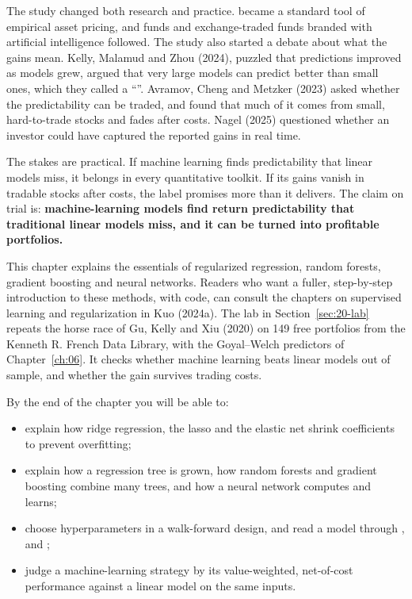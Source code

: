 The study changed both research and practice.  became a standard tool of empirical asset pricing, and funds and exchange-traded funds branded with artificial intelligence followed. The study also started a debate about what the gains mean. Kelly, Malamud and Zhou (2024), puzzled that predictions improved as models grew, argued that very large models can predict better than small ones, which they called a ``''. Avramov, Cheng and Metzker (2023) asked whether the predictability can be traded, and found that much of it comes from small, hard-to-trade stocks and fades after costs. Nagel (2025) questioned whether an investor could have captured the reported gains in real time.

The stakes are practical. If machine learning finds predictability that linear models miss, it belongs in every quantitative toolkit. If its gains vanish in tradable stocks after costs, the label promises more than it delivers. The claim on trial is: \textbf{machine-learning models find return predictability that traditional linear models miss, and it can be turned into profitable portfolios.}

This chapter explains the essentials of regularized regression, random forests, gradient boosting and neural networks. Readers who want a fuller, step-by-step introduction to these methods, with code, can consult the chapters on supervised learning and regularization in Kuo (2024a). The lab in Section~\ref{sec:20-lab} repeats the horse race of Gu, Kelly and Xiu (2020) on 149 free portfolios from the Kenneth R. French Data Library, with the Goyal--Welch predictors of Chapter~\ref{ch:06}. It checks whether machine learning beats linear models out of sample, and whether the gain survives trading costs.

By the end of the chapter you will be able to:

\begin{itemize}
  \item explain how ridge regression, the lasso and the elastic net shrink coefficients to prevent overfitting;
  \item explain how a regression tree is grown, how random forests and gradient boosting combine many trees, and how a neural network computes and learns;
  \item choose hyperparameters in a walk-forward design, and read a model through ,  and ;
  \item judge a machine-learning strategy by its value-weighted, net-of-cost performance against a linear model on the same inputs.
\end{itemize}

